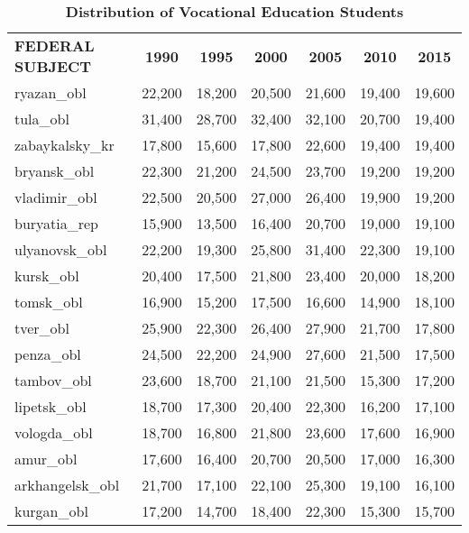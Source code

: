 \documentclass[alpha-refs,fleqn]{wiley-article_p2}
\begin{document}
\setcounter{table}{0} 
\renewcommand{\thetable}{A\arabic{table}}
\smaller
\begin{table}[h]
\caption{\textbf{Distribution of Vocational Education Students}}\label{table:a1}
\begin{threeparttable}
\setlength{\tabcolsep}{5pt}
\renewcommand{\arraystretch}{1.25}
\begin{tabular}{p{5.5cm}cccccc}
\rowcolor{grey!30} 
\textbf{FEDERAL SUBJECT}	&	\textbf{1990}	&	\textbf{1995}	&	\textbf{2000}	&	\textbf{2005}	&	\textbf{2010}	&	\textbf{2015} 	\\
ryazan\_obl	&	22,200	&	18,200	&	20,500	&	21,600	&	19,400	&	19,600	\\
\rowcolor{pink!20}
tula\_obl	&	31,400	&	28,700	&	32,400	&	32,100	&	20,700	&	19,400	\\
zabaykalsky\_kr	&	17,800	&	15,600	&	17,800	&	22,600	&	19,400	&	19,400	\\
bryansk\_obl	&	22,300	&	21,200	&	24,500	&	23,700	&	19,200	&	19,200	\\
vladimir\_obl	&	22,500	&	20,500	&	27,000	&	26,400	&	19,900	&	19,200	\\
\rowcolor{blue!20}
buryatia\_rep	&	15,900	&	13,500	&	16,400	&	20,700	&	19,000	&	19,100	\\
ulyanovsk\_obl	&	22,200	&	19,300	&	25,800	&	31,400	&	22,300	&	19,100	\\
kursk\_obl	&	20,400	&	17,500	&	21,800	&	23,400	&	20,000	&	18,200	\\
tomsk\_obl	&	16,900	&	15,200	&	17,500	&	16,600	&	14,900	&	18,100	\\
\rowcolor{pink!20}
tver\_obl	&	25,900	&	22,300	&	26,400	&	27,900	&	21,700	&	17,800	\\
\rowcolor{pink!20}
penza\_obl	&	24,500	&	22,200	&	24,900	&	27,600	&	21,500	&	17,500	\\
\rowcolor{pink!20}
tambov\_obl	&	23,600	&	18,700	&	21,100	&	21,500	&	15,300	&	17,200	\\
lipetsk\_obl	&	18,700	&	17,300	&	20,400	&	22,300	&	16,200	&	17,100	\\
vologda\_obl	&	18,700	&	16,800	&	21,800	&	23,600	&	17,600	&	16,900	\\
amur\_obl	&	17,600	&	16,400	&	20,700	&	20,500	&	17,000	&	16,300	\\
arkhangelsk\_obl	&	21,700	&	17,100	&	22,100	&	25,300	&	19,100	&	16,100	\\
kurgan\_obl	&	17,200	&	14,700	&	18,400	&	22,300	&	15,300	&	15,700	\\

\end{tabular}
\end{threeparttable}
\end{table}
\end{document}
